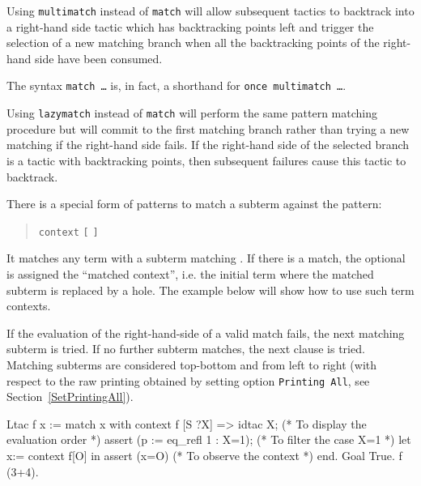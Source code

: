 \begin{Variants}

\item {}
Using {\tt multimatch} instead of {\tt match} will allow subsequent
tactics to backtrack into a right-hand side tactic which has
backtracking points left and trigger the selection of a new matching
branch when all the backtracking points of the right-hand side have
been consumed.

The syntax {\tt match \ldots} is, in fact, a shorthand for
{\tt once multimatch \ldots}.

\item {}
Using {\tt lazymatch} instead of {\tt match} will perform the same
pattern matching procedure but will commit to the first matching
branch rather than trying a new matching if the right-hand side
fails. If the right-hand side of the selected branch is a tactic with
backtracking points, then subsequent failures cause this tactic to
backtrack.

\item {}
There is a special form of patterns to match a subterm against the
pattern:
\begin{quote}
{\tt context} {\ident} {\tt [} {\cpattern} {\tt ]}
\end{quote}
It matches any term with a subterm matching {\cpattern}. If there is
a match, the optional {\ident} is assigned the ``matched context'', i.e.
the initial term where the matched subterm is replaced by a
hole. The example below will show how to use such term contexts.

If the evaluation of the right-hand-side of a valid match fails, the
next matching subterm is tried. If no further subterm matches, the
next clause is tried. Matching subterms are considered top-bottom and
from left to right (with respect to the raw printing obtained by
setting option {\tt Printing All}, see Section~\ref{SetPrintingAll}).

\begin{coq_example}
Ltac f x :=
  match x with
    context f [S ?X] => 
    idtac X;                    (* To display the evaluation order *)
    assert (p := eq_refl 1 : X=1);    (* To filter the case X=1 *)
    let x:= context f[O] in assert (x=O) (* To observe the context *)
  end.
Goal True.
f (3+4).
\end{coq_example}


\end{Variants}

